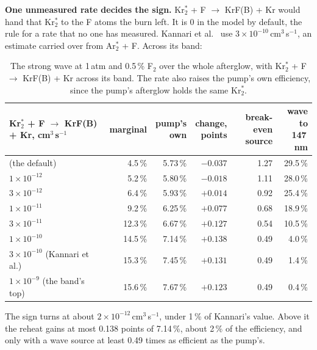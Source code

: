 \documentclass[11pt]{article}
\newcommand{\Krts}{Kr\ensuremath{_2^*}}
\newcommand{\Ft}{F\ensuremath{_2}}
\begin{document}
\textbf{One unmeasured rate decides the sign.} \Krts{} + F $\to$ KrF(B) + Kr would hand that
\Krts{} to the F atoms the burn left. It is 0 in the model by default, the rule for a rate that no
one has measured. Kannari et al.\ \cite{Kannari1985} use $3\times10^{-10}$\,cm$^3$\,s$^{-1}$, an
estimate carried over from Ar$_2^*$ + F. Across its band:

\begin{table}[H]
\small
\begin{tabularx}{\textwidth}{@{}>{\raggedright\arraybackslash}Xrrrrr@{}}
\toprule
\Krts{} + F $\to$ KrF(B) + Kr, cm$^3$\,s$^{-1}$ & marginal & \shortstack[r]{pump's\\own} &
\shortstack[r]{change,\\points} & \shortstack[r]{break-even\\source} & \shortstack[r]{wave to\\147\,nm} \\
\midrule
0 (the default) & 4.5\,\% & 5.73\,\% & $-0.037$ & 1.27 & 29.5\,\% \\
$1\times10^{-12}$ & 5.2\,\% & 5.80\,\% & $-0.018$ & 1.11 & 28.0\,\% \\
$3\times10^{-12}$ & 6.4\,\% & 5.93\,\% & $+0.014$ & 0.92 & 25.4\,\% \\
$1\times10^{-11}$ & 9.2\,\% & 6.25\,\% & $+0.077$ & 0.68 & 18.9\,\% \\
$3\times10^{-11}$ & 12.3\,\% & 6.67\,\% & $+0.127$ & 0.54 & 10.5\,\% \\
$1\times10^{-10}$ & 14.5\,\% & 7.14\,\% & $+0.138$ & 0.49 & 4.0\,\% \\
$3\times10^{-10}$ (Kannari et al.) & 15.3\,\% & 7.45\,\% & $+0.131$ & 0.49 & 1.4\,\% \\
$1\times10^{-9}$ (the band's top) & 15.6\,\% & 7.67\,\% & $+0.123$ & 0.49 & 0.4\,\% \\
\bottomrule
\end{tabularx}
\caption{The strong wave at 1\,atm and 0.5\,\% \Ft{} over the whole afterglow, with \Krts{} + F
$\to$ KrF(B) + Kr across its band. The rate also raises the pump's own efficiency, since the
pump's afterglow holds the same \Krts{}.}
\label{tab:kr2f}
\end{table}

The sign turns at about $2\times10^{-12}$\,cm$^3$\,s$^{-1}$, under 1\,\% of Kannari's value. Above it
the reheat gains at most 0.138 points of 7.14\,\%, about 2\,\% of the efficiency, and only with a
wave source at least 0.49 times as efficient as the pump's.
\end{document}
